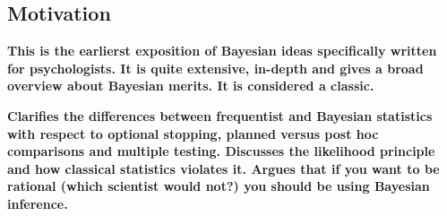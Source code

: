 \documentclass[12pt]{scrartcl}
\begin{document}
\subsection{Motivation}
\begin{description}  
  \item {}
  
  \textbf{This is the earlierst exposition of Bayesian ideas specifically written for psychologists. It is quite extensive, in-depth and gives a broad overview about Bayesian merits. It is considered a classic.}
  
  \item {}
  
  \item {}
  
  \item {}
  
  \item {}
  
  \textbf{Clarifies the differences between frequentist and Bayesian statistics with respect to optional stopping, planned versus post hoc comparisons and multiple testing. Discusses the likelihood principle and how classical statistics violates it. Argues that if you want to be rational (which scientist would not?) you should be using Bayesian inference.
  }
  
  \item {}
  
  \item {}
  
  \item {}
\end{description}
\end{document}

